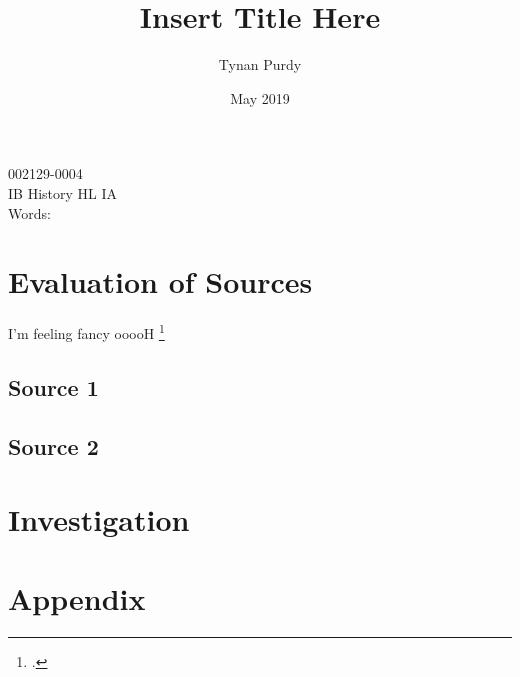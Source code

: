 \documentclass[12pt,letterpaper]{article}
\title{Insert Title Here}
\author{Tynan Purdy}
\date{May 2019}
\begin{document}
\large
\parindent=0.5in
{\fontsize{12}{14.4}
	{\singlespace
	    \maketitle
	    \begin{center}
	    002129-0004 \\
	    \vspace{4mm}
	    IB History HL IA \\
	    \vspace{4mm}
	    Words:  \\ %
	\end{center}
	}
}	






\newpage
\tableofcontents
{}
\newpage

\section{Evaluation of Sources}
I'm feeling fancy ooooH \footcite[4]{guttmann}  
\subsection{Source 1}

\subsection{Source 2}

\section{Investigation}

\newpage
\printbibliography

\newpage
\section{Appendix}
\listoffigures
\end{document}
